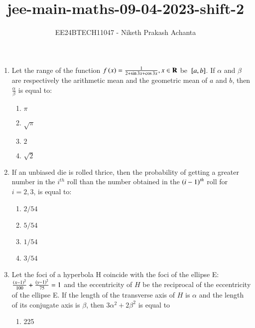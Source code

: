 \documentclass[journal]{IEEEtran}
\renewcommand{\thefigure}{\theenumi}
\renewcommand{\thetable}{\theenumi}
\numberwithin{equation}{enumi}
\numberwithin{figure}{enumi}
\renewcommand{\thetable}{\theenumi}
\begin{document}

\vspace{3cm}

\title{jee-main-maths-09-04-2023-shift-2}
\author{EE24BTECH11047 - Niketh Prakash Achanta}
{\let\newpage\relax\maketitle}
\renewcommand{\thefigure}{\theenumi}
\renewcommand{\thetable}{\theenumi}

\begin{enumerate}

    \item Let the range of the function $f\left(x\right)=\frac{1}{2+\sin{3x}+\cos{3x}},x\in\mathbf{R}$ be ${}\left[a, b\right]$. If $\alpha$ and $\beta$ are respectively the arithmetic mean and the geometric mean of $a$ and $b$, then $\frac{\alpha}{\beta}$ is equal to:
    \begin{enumerate}
        \item $\pi$
        \item $\sqrt{\pi}$
        \item $2$
        \item $\sqrt{2}$
    \end{enumerate}
    \item If an unbiased die is rolled thrice, then the probability of getting a greater number in the $i^{th}$ roll than the number obtained in the $\left(i-1\right)^{th}$ roll for $i = 2, 3$, is equal to:
    \begin{enumerate}
        \item $2/54$
        \item $5/54$
        \item $1/54$
        \item $3/54$
    \end{enumerate}
    \item Let the foci of a hyperbola H coincide with the foci of the ellipse E:$\frac{\left(x-1\right)^2}{100} + \frac{\left(y-1\right)^2}{75} = 1$ and the eccentricity of $H$ be the reciprocal of the eccentricity of the ellipse E. If the length of the transverse axis of $H$ is $\alpha$ and the length of its conjugate axis is $\beta$, then $3\alpha^2 + 2\beta^2$ is equal to
    \begin{enumerate}
        \item 225

\end{enumerate}
\end{enumerate}
\end{document}
